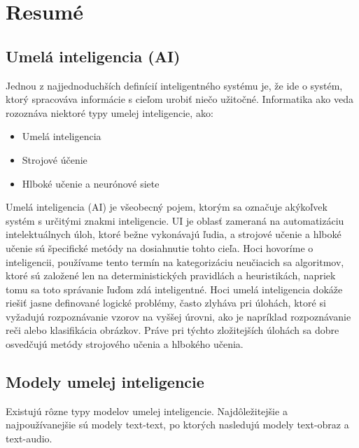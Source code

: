 \chapter{Resumé}


\section*{Umelá inteligencia (AI) \label{sec:AI_resume}}

Jednou z najjednoduchších definícií inteligentného systému je, že ide o systém, ktorý spracováva informácie s cieľom urobiť niečo užitočné. Informatika ako veda rozoznáva niektoré typy umelej inteligencie, ako:

\begin{itemize}
    \item Umelá inteligencia
    \item Strojové účenie
    \item Hlboké učenie a neurónové siete
\end{itemize}

Umelá inteligencia (AI) je všeobecný pojem, ktorým sa označuje akýkoľvek systém s určitými znakmi inteligencie. UI je oblasť zameraná na automatizáciu intelektuálnych úloh, ktoré bežne vykonávajú ľudia, a strojové učenie a hlboké učenie sú špecifické metódy na dosiahnutie tohto cieľa. Hoci hovoríme o inteligencii, používame tento termín na kategorizáciu neučiacich sa algoritmov, ktoré sú založené len na deterministických pravidlách a heuristikách, napriek tomu sa toto správanie ľuďom zdá inteligentné. Hoci umelá inteligencia dokáže riešiť jasne definované logické problémy, často zlyháva pri úlohách, ktoré si vyžadujú rozpoznávanie vzorov na vyššej úrovni, ako je napríklad rozpoznávanie reči alebo klasifikácia obrázkov. Práve pri týchto zložitejších úlohách sa dobre osvedčujú metódy strojového učenia a hlbokého učenia.

\section*{Modely umelej inteligencie \label{sec:AI_models_resume}}

Existujú rôzne typy modelov umelej inteligencie. Najdôležitejšie a najpoužívanejšie sú modely text-text, po ktorých nasledujú modely text-obraz a text-audio. 

